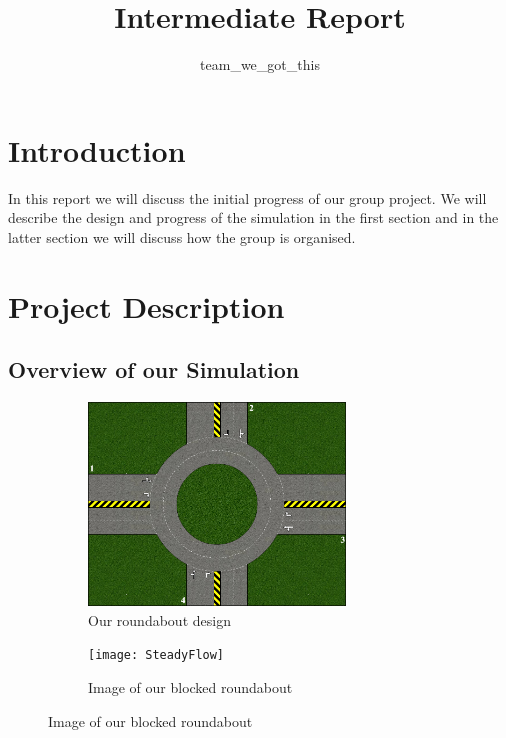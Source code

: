 \documentclass[11pt]{article}
\title{{Intermediate Report}}
\date{}
\author{team\_we\_got\_this}
\begin{document}
	\maketitle
	\thispagestyle{fancy}
	\section{Introduction}
	In this report we will discuss the initial progress of our group project. 
	We will describe the design and progress of the simulation in the first section and in the latter section we will discuss how the group is organised.
	
	\section{Project Description}
	
	\subsection{Overview of our Simulation}
	\begin{figure}
		\begin{subfigure}{.45\textwidth}
		\centering
		\includegraphics[width=0.75\textwidth]{Roundabout2}
		\caption{Our roundabout design}
		\label{RoundaboutDesign}
		\end{subfigure}
		\begin{subfigure}{.45\textwidth}
		\centering
		\texttt{[image: SteadyFlow]}
		\caption{Image of our blocked roundabout}
		\label{Steadyflow}
		\end{subfigure}
	\end{figure}
\end{document}
